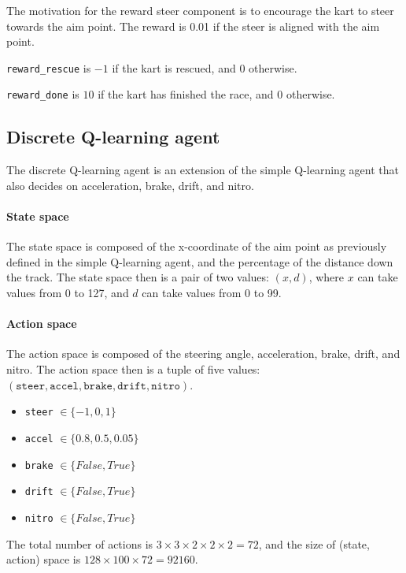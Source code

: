 \documentclass{article}
\begin{document}
The motivation for the reward steer component is to encourage the kart to steer towards the aim point. The reward is 0.01 if the steer is aligned with the aim point.

\texttt{reward\_rescue} is $-1$ if the kart is rescued, and $0$ otherwise.

\texttt{reward\_done} is $10$ if the kart has finished the race, and $0$ otherwise.


\subsection{Discrete Q-learning agent}

The discrete Q-learning agent is an extension of the simple Q-learning agent that also decides on acceleration, brake, drift, and nitro.

\paragraph{State space}

The state space is composed of the x-coordinate of the aim point as previously defined in the simple Q-learning agent, and the percentage of the distance down the track. The state space then is a pair of two values: $(x, d)$, where $x$ can take values from 0 to 127, and $d$ can take values from 0 to 99.

\paragraph{Action space}

The action space is composed of the steering angle, acceleration, brake, drift, and nitro. The action space then is a tuple of five values: $(\texttt{steer}, \texttt{accel}, \texttt{brake}, \texttt{drift}, \texttt{nitro})$.

\begin{itemize}
    \item \texttt{steer}  $\in \{-1, 0, 1\}$
    \item \texttt{accel} $\in \{0.8, 0.5, 0.05\}$
    \item \texttt{brake} $\in \{False, True\}$
    \item \texttt{drift} $\in \{False, True\}$
    \item \texttt{nitro} $\in \{False, True\}$
\end{itemize}

The total number of actions is $3 \times 3 \times 2 \times 2 \times 2 = 72$, and the size of (state, action) space is $128 \times 100 \times 72 = 92160$.
\end{document}
